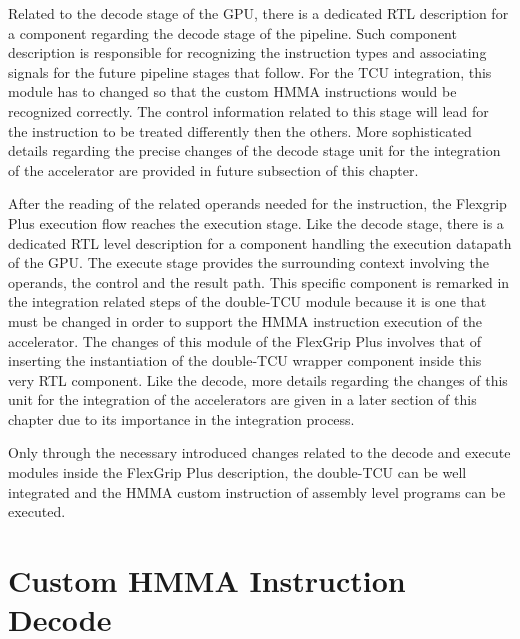 
Related to the decode stage of the GPU, there is a dedicated RTL description for a component regarding the decode stage of the pipeline. Such component description is responsible for recognizing the instruction types and associating signals for the future pipeline stages that follow. For the TCU integration, this module has to changed so that the custom HMMA instructions would be recognized correctly. The control information related to this stage will lead for the instruction to be treated differently then the others. More sophisticated details regarding the precise changes of the decode stage unit for the integration of the accelerator are provided in future subsection of this chapter. 


After the reading of the related operands needed for the instruction, the Flexgrip Plus execution flow reaches the execution stage. Like the decode stage, there is a dedicated RTL level description for a component handling the execution datapath of the GPU. The execute stage provides the surrounding context involving the operands, the control and the result path. This specific component is remarked in the integration related steps of the double-TCU module because it is one that must be changed in order to support the HMMA instruction execution of the accelerator. The changes of this module of the FlexGrip Plus involves that of inserting the instantiation of the double-TCU wrapper component inside this very RTL component. Like the decode, more details regarding the changes of this unit for the integration of the accelerators are given in a later section of this chapter due to its importance in the integration process.


Only through the necessary introduced changes related to the decode and execute modules inside the FlexGrip Plus description, the double-TCU can be well integrated and the HMMA custom instruction of assembly level programs can be executed. 

\section{Custom HMMA Instruction Decode}


